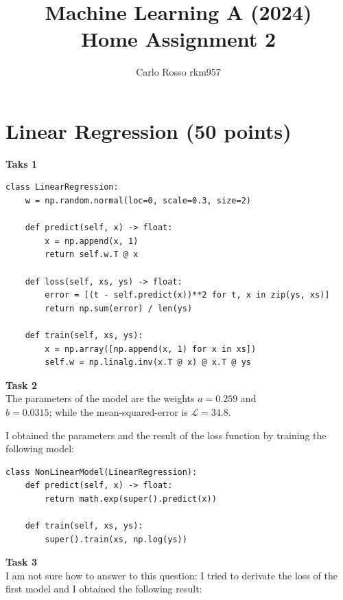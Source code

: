\documentclass[a4paper,12pt]{article}
\begin{document}
\title{Machine Learning A (2024)\\Home Assignment 2}
\author{Carlo Rosso rkm957}
\date{}
\maketitle

\tableofcontents %
\newpage %


\section{Linear Regression (50 points)}

\textbf{Taks 1}
\begin{lstlisting}
class LinearRegression:
    w = np.random.normal(loc=0, scale=0.3, size=2)
        
    def predict(self, x) -> float:
        x = np.append(x, 1)
        return self.w.T @ x
        
    def loss(self, xs, ys) -> float:
        error = [(t - self.predict(x))**2 for t, x in zip(ys, xs)]
        return np.sum(error) / len(ys)
        
    def train(self, xs, ys):
        x = np.array([np.append(x, 1) for x in xs])
        self.w = np.linalg.inv(x.T @ x) @ x.T @ ys
\end{lstlisting}

\vspace{1em}
\noindent\textbf{Task 2}\\
The parameters of the model are the weights $a = 0.259$ and\\
$b = 0.0315$; while the mean-squared-error is
$\mathcal{L} = 34.8$.

I obtained the parameters and the result of the loss function by training the
following model:

\begin{lstlisting}
class NonLinearModel(LinearRegression):
    def predict(self, x) -> float:
        return math.exp(super().predict(x))
    
    def train(self, xs, ys):
        super().train(xs, np.log(ys))
\end{lstlisting}

\vspace{1em}
\noindent\textbf{Task 3}\\
I am not sure how to answer to this question: I tried to derivate the loss of
the first model and I obtained the following result:
\end{document}
